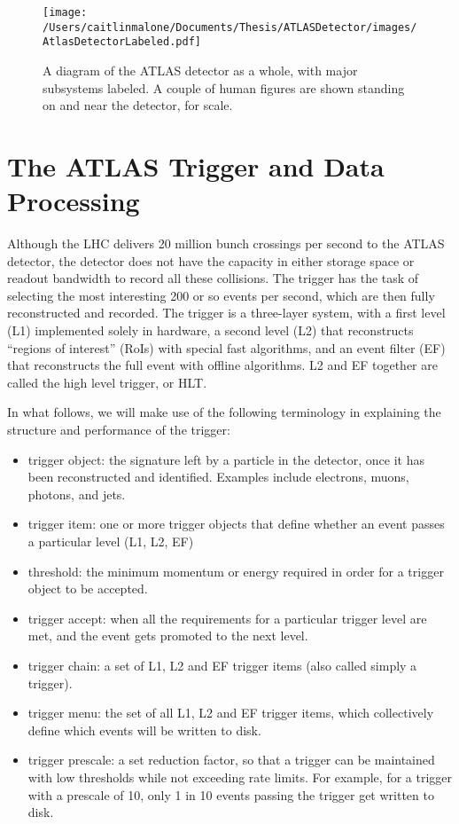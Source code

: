 \begin{figure}
	\texttt{[image: /Users/caitlinmalone/Documents/Thesis/ATLASDetector/images/AtlasDetectorLabeled.pdf]}	\caption{A diagram of the ATLAS detector as a whole, with major subsystems labeled.  A couple of human figures are shown standing on and near the detector, for scale. \label{fig:detector}}
\end{figure}

\section{The ATLAS Trigger and Data Processing}
\label{sec:atlas_trig}
Although the LHC delivers 20 million bunch crossings per second to the ATLAS detector, the detector does not have the capacity in either storage space or readout bandwidth to record all these collisions.  The trigger has the task of selecting the most interesting 200 or so events per second, which are then fully reconstructed and recorded.  The trigger is a three-layer system, with a first level (L1) implemented solely in hardware, a second level (L2) that reconstructs ``regions of interest'' (RoIs) with special fast algorithms, and an event filter (EF) that reconstructs the full event with offline algorithms.  L2 and EF together are called the high level trigger, or HLT.

In what follows, we will make use of the following terminology in explaining the structure and performance of the trigger:

\begin{itemize}
	\item trigger object: the signature left by a particle in the detector, once it has been reconstructed and identified.  Examples include electrons, muons, photons, and jets.
	\item trigger item: one or more trigger objects that define whether an event passes a particular level (L1, L2, EF)
	\item threshold: the minimum momentum or energy required in order for a trigger object to be accepted.
	\item trigger accept: when all the requirements for a particular trigger level are met, and the event gets promoted to the next level.

	\item trigger chain: a set of L1, L2 and EF trigger items (also called simply a trigger).
	\item trigger menu: the set of all L1, L2 and EF trigger items, which collectively define which events will be written to disk.
	\item trigger prescale: a set reduction factor, so that a trigger can be maintained with low thresholds while not exceeding rate limits.  For example, for a trigger with a prescale of 10, only 1 in 10 events passing the trigger get written to disk.
\end{itemize}
 

